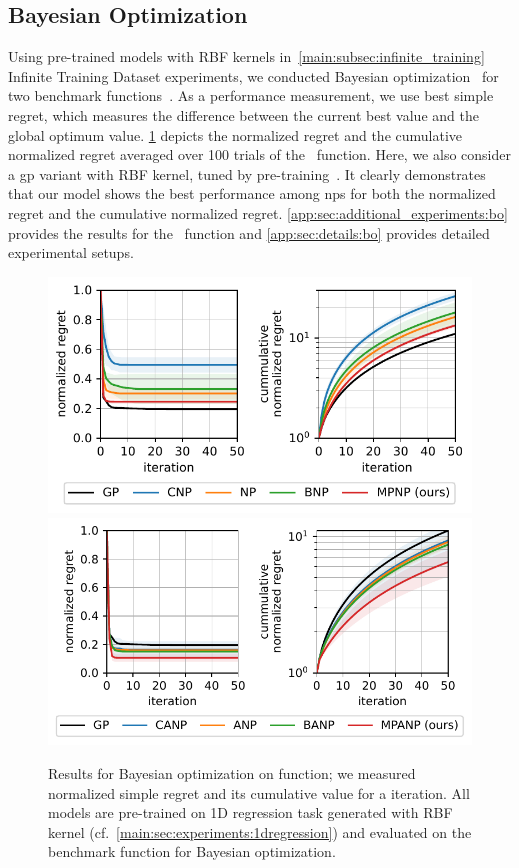 \subsection{Bayesian Optimization}
\label{main:sec:experiments:bo}
Using pre-trained models with RBF kernels in~\cref{main:subsec:infinite_training} Infinite Training Dataset experiments, we conducted Bayesian optimization~\citep{brochu2010tutorial} for two benchmark functions~\citep{gramacy2012cases,sobester2008engineering}. As a performance measurement, we use best simple regret, which measures the difference between the current best value and the global optimum value. \cref{figure/main_bo_gram} depicts the normalized regret and the cumulative normalized regret averaged over 100 trials of the~\citet{gramacy2012cases} function.
Here, we also consider a \gls{gp} variant with RBF kernel, tuned by pre-training~\citep{wang2021automatic}.
It clearly demonstrates that our model shows the best performance among \glspl{np} for both the normalized regret and the cumulative normalized regret. \cref{app:sec:additional_experiments:bo} provides the results for the~\citet{sobester2008engineering} function and \cref{app:sec:details:bo} provides detailed experimental setups.


\begin{figure}
\centering
\includegraphics[width=0.49\linewidth]{figure/main_bo_gram_np}
\includegraphics[width=0.49\linewidth]{figure/main_bo_gram_anp}
\caption{Results for Bayesian optimization on \citet{gramacy2012cases} function; we measured normalized simple regret and its cumulative value for a iteration. All models are pre-trained on 1D regression task generated with RBF kernel (cf.~\cref{main:sec:experiments:1dregression}) and evaluated on the benchmark function for Bayesian optimization.}
\label{figure/main_bo_gram}
\end{figure}


